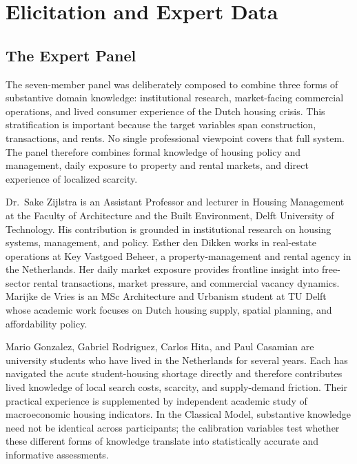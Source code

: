 \chapter{Elicitation and Expert Data}
\label{chapter:elicitation}

\section{The Expert Panel}
\label{sec:expert_panel}

The seven-member panel was deliberately composed to combine three forms of substantive domain knowledge: institutional research, market-facing commercial operations, and lived consumer experience of the Dutch housing crisis. This stratification is important because the target variables span construction, transactions, and rents. No single professional viewpoint covers that full system. The panel therefore combines formal knowledge of housing policy and management, daily exposure to property and rental markets, and direct experience of localized scarcity.

Dr.~Sake Zijlstra is an Assistant Professor and lecturer in Housing Management at the Faculty of Architecture and the Built Environment, Delft University of Technology. His contribution is grounded in institutional research on housing systems, management, and policy. Esther den Dikken works in real-estate operations at Key Vastgoed Beheer, a property-management and rental agency in the Netherlands. Her daily market exposure provides frontline insight into free-sector rental transactions, market pressure, and commercial vacancy dynamics. Marijke de Vries is an MSc Architecture and Urbanism student at TU Delft whose academic work focuses on Dutch housing supply, spatial planning, and affordability policy.

Mario Gonzalez, Gabriel Rodriguez, Carlos Hita, and Paul Casamian are university students who have lived in the Netherlands for several years. Each has navigated the acute student-housing shortage directly and therefore contributes lived knowledge of local search costs, scarcity, and supply-demand friction. Their practical experience is supplemented by independent academic study of macroeconomic housing indicators. In the Classical Model, substantive knowledge need not be identical across participants; the calibration variables test whether these different forms of knowledge translate into statistically accurate and informative assessments.

